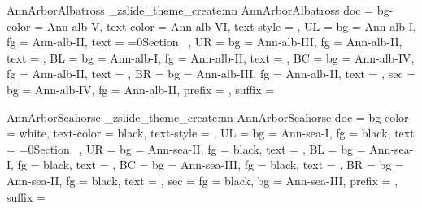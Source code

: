{  %
  {AnnArborAlbatross}{
    \_zslide_theme_create:nn {AnnArborAlbatross}{
      doc = {
        bg-color = Ann-alb-V,
        text-color = Ann-alb-VI,
        text-style = \sfdefault
      },
      UL = {
        bg   = Ann-alb-I,
        fg   = Ann-alb-II, 
        text = {\ifnum{}=0\else Section\ \thesection\fi} 
      },
      UR = {
        bg   = Ann-alb-III,
        fg   = Ann-alb-II,
        text = {\zslideDefaultUR}
      },
      BL = {
        bg   = Ann-alb-I,
        fg   = Ann-alb-II,
        text = \zslideAuthor
      },
      BC = {
        bg   = Ann-alb-IV,
        fg   = Ann-alb-II,
        text = \zslideTitle
      },
      BR = {
        bg   = Ann-alb-III,
        fg   = Ann-alb-II,
        text = \zslideDefaultBR 
      },
      sec = {
        bg   = Ann-alb-IV,
        fg   = Ann-alb-II,
        prefix = {},
        suffix = {}
      }
    }
  }

  {AnnArborSeahorse}{
    \_zslide_theme_create:nn {AnnArborSeahorse}{
      doc = {
        bg-color = white,
        text-color = black,
        text-style = \sfdefault
      },
      UL = {
        bg   = Ann-sea-I,
        fg   = black,
        text = {\ifnum{}=0\else Section\ \thesection\fi}
      },
      UR = {
        bg   = Ann-sea-II,
        fg   = black,
        text = {\zslideDefaultUR}
      },
      BL = {
        bg   = Ann-sea-I,
        fg   = black,
        text = \zslideAuthor
      },
      BC = {
        bg   = Ann-sea-III,
        fg   = black,
        text = \zslideTitle
      },
      BR = {
        bg   = Ann-sea-II,
        fg   = black,
        text = \zslideDefaultBR
      },
      sec = {
        fg   = black,
        bg   = Ann-sea-III,
        prefix = {},
        suffix = {}
      }
    }
  }

}
